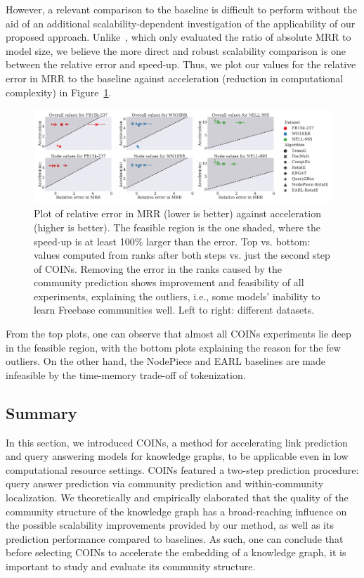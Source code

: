 However, a relevant comparison to the baseline is difficult to perform without the aid of an additional scalability-dependent investigation of the applicability of our proposed approach. Unlike~\cite{chen_entity-agnostic_2023}, which only evaluated the ratio of absolute MRR to model size, we believe the more direct and robust scalability comparison is one between the relative error and speed-up. Thus, we plot our values for the relative error in MRR to the baseline against acceleration (reduction in computational complexity) in Figure~\ref{fig:feasibility}. 

\begin{figure}[H]
\begin{center}
\includegraphics[width=\textwidth]{figures/coins/feasibility_2.pdf}
\end{center}
\caption[Plot of relative error in MRR against acceleration.]{Plot of relative error in MRR (lower is better) against acceleration (higher is better). The feasible region is the one shaded, where the speed-up is at least 100\% larger than the error. Top vs. bottom: values computed from ranks after both steps vs. just the second step of COINs. Removing the error in the ranks caused by the community prediction shows improvement and feasibility of all experiments, explaining the outliers, i.e., some models' inability to learn Freebase communities well. Left to right: different datasets.}
\label{fig:feasibility}
\end{figure}

From the top plots, one can observe that almost all COINs experiments lie deep in the feasible region, with the bottom plots explaining the reason for the few outliers. On the other hand, the NodePiece and EARL baselines are made infeasible by the time-memory trade-off of tokenization.

\subsection{Summary}

In this section, we introduced COINs, a method for accelerating link prediction and query answering models for knowledge graphs, to be applicable even in low computational resource settings. COINs featured a two-step prediction procedure: query answer prediction via community prediction and within-community localization. 
We theoretically and empirically elaborated that the quality of the community structure of the knowledge graph has a broad-reaching influence on the possible scalability improvements provided by our method, as well as its prediction performance compared to baselines. As such, one can conclude that before selecting COINs to accelerate the embedding of a knowledge graph, it is important to study and evaluate its community structure. 

